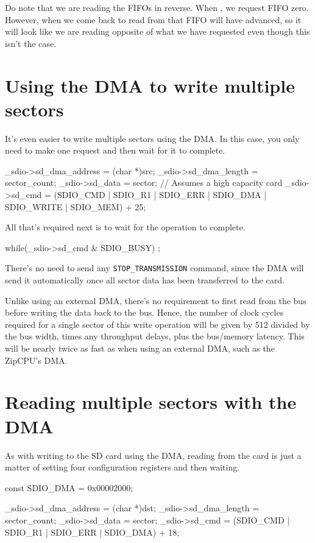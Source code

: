 \documentclass{gqtekspec}
\begin{document}
Do note that we are reading the FIFOs in reverse.  When ,
we request FIFO zero.  However, when we come back to read from that FIFO
 will have advanced, so it will look like we are reading opposite
of what we have requested even though this isn't the case.
\section{Using the DMA to write multiple sectors}
It's even easier to write multiple sectors using the DMA.  In this case,
you only need to make one request and then wait for it to complete.

\begin{zCpp}
	_sdio->sd_dma_address = (char *)src;
	_sdio->sd_dma_length = sector_count;
	_sdio->sd_data = sector;	// Assumes a high capacity card
	_sdio->sd_cmd  = (SDIO_CMD | SDIO_R1 | SDIO_ERR | SDIO_DMA
				| SDIO_WRITE | SDIO_MEM) + 25;
\end{zCpp}

All that's required next is to wait for the operation to complete.

\begin{zCpp}
	while(_sdio->sd_cmd & SDIO_BUSY)
		;
\end{zCpp}

There's no need to send any {\tt STOP\_TRANSMISSION} command, since the DMA
will send it automatically once all sector data has been transferred to the
card.

Unlike using an external DMA, there's no requirement to first read from the
bus before writing the data back to the bus.  Hence, the number of clock
cycles required for a single sector of this write operation will be given
by 512 divided by the bus width, times any throughput delays, plus the
bus/memory latency.  This will be nearly twice as fast as when using an
external DMA, such as the ZipCPU's DMA.
\section{Reading multiple sectors with the DMA}
As with writing to the SD card using the DMA, reading from the card is just
a matter of setting four configuration registers and then waiting.

\begin{zCpp}
	const	SDIO_DMA  = 0x00002000;

	_sdio->sd_dma_address = (char *)dst;
	_sdio->sd_dma_length = sector_count;
	_sdio->sd_data = sector;
	_sdio->sd_cmd  = (SDIO_CMD | SDIO_R1 | SDIO_ERR | SDIO_DMA) + 18;
\end{zCpp}
\end{document}

